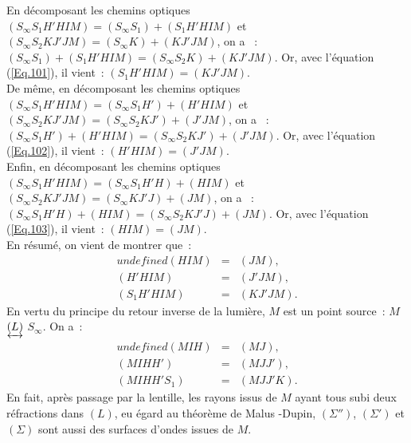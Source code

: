 \documentclass{article}
\begin{document}
En décomposant les chemins optiques $\left(S_{\mathrm{\infty}}S_{1}H'HIM\right) =
\left(S_{\mathrm{\infty}}S_{1}\right)+\left(S_{1}H'HIM\right)$ et $\left(S_{\mathrm{\infty}}S_{2}KJ'JM\right) =
\left(S_{\mathrm{\infty}}K\right)+\left(KJ'JM\right)$, on a  : $\left(S_{\mathrm{\infty}}S_{1}\right)+\left(S_{1}H'HIM\right) =
\left(S_{\mathrm{\infty}}S_{2}K\right)+\left(KJ'JM\right)$. Or, avec l'équation (\ref{Eq.101}), il
vient : $\left(S_{1}H'HIM\right) = \left(KJ'JM\right)$. \\
De même, en décomposant les chemins optiques $\left(S_{\mathrm{\infty}}S_{1}H'HIM\right)
= \left(S_{\mathrm{\infty}}S_{1}H'\right)+\left(H'HIM\right)$ et $\left(S_{\mathrm{\infty}}S_{2}KJ'JM\right) =
\left(S_{\mathrm{\infty}}S_{2}KJ'\right)+(J'JM)$, on a  : $\left(S_{\mathrm{\infty}}S_{1}H'\right)+\left(H'HIM\right) =
\left(S_{\mathrm{\infty}}S_{2}KJ'\right)+(J'JM)$. Or, avec l'équation (\ref{Eq.102}), il
vient : $\left(H'HIM\right) = (J'JM)$. \\
Enfin, en décomposant les chemins optiques $\left(S_{\mathrm{\infty}}S_{1}H'HIM\right) =
\left(S_{\mathrm{\infty}}S_{1}H'H\right)+(HIM)$ et $\left(S_{\mathrm{\infty}}S_{2}KJ'JM\right) =
\left(S_{\mathrm{\infty}}KJ'J\right)+(JM)$, on a  : $\left(S_{\mathrm{\infty}}S_{1}H'H\right)+(HIM) =
\left(S_{\mathrm{\infty}}S_{2}KJ'J\right)+(JM)$. Or, avec l'équation (\ref{Eq.103}), il
vient : $(HIM) = (JM)$.
\\
En résumé, on vient de montrer que :
\begin{eqnarray}undefined
(HIM) &=& (JM), \label{Eq.107} \\
\left(H'HIM\right) &=& (J'JM), \label{Eq.108} \\
\left(S_{1}H'HIM\right) &=& \left(KJ'JM\right). \label{Eq.109}
\end{eqnarray}
En vertu du principe du retour inverse de la lumière, $M$ est un
point source : $M$ $\underleftrightarrow{(L)}$ $S_{\mathrm{\infty}}$. On a :
\begin{eqnarray}undefined
(MIH) &=& (MJ), \label{Eq.104} \\
\left(MIHH'\right) &=& (MJJ'), \label{Eq.105} \\
\left(MIHH'S_{1}\right) &=& \left(MJJ'K\right). \label{Eq.106}
\end{eqnarray}
En fait, après passage par la lentille, les rayons issus de $M$
ayant tous subi deux réfractions dans $(L)$, eu égard au théorème de
Malus -Dupin, $\left(\Sigma''\right)$, $\left(\Sigma'\right)$ et $\left(\Sigma\right)$ sont aussi des
surfaces d'ondes issues de $M$.
\\
\end{document}
